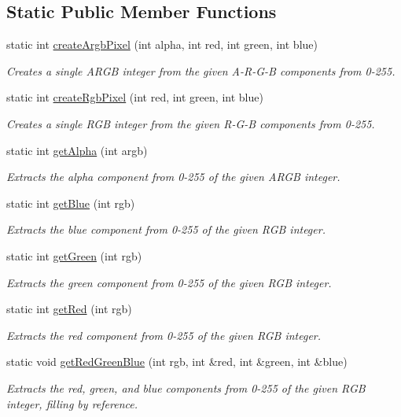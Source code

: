 \subsection*{Static Public Member Functions}
\begin{DoxyCompactItemize}
\item 
static int \mbox{\hyperlink{classsgl_1_1GCanvas_a5ef799a28166a7f009365102168a2d06}{create\+Argb\+Pixel}} (int alpha, int red, int green, int blue)
\begin{DoxyCompactList}\small\item\em Creates a single A\+R\+GB integer from the given A-\/\+R-\/\+G-\/B components from 0-\/255. \end{DoxyCompactList}\item 
static int \mbox{\hyperlink{classsgl_1_1GCanvas_a10beefcf8631433d0cdddefd4e24c76a}{create\+Rgb\+Pixel}} (int red, int green, int blue)
\begin{DoxyCompactList}\small\item\em Creates a single R\+GB integer from the given R-\/\+G-\/B components from 0-\/255. \end{DoxyCompactList}\item 
static int \mbox{\hyperlink{classsgl_1_1GCanvas_a48d898ddf58651669b5f33240a65096f}{get\+Alpha}} (int argb)
\begin{DoxyCompactList}\small\item\em Extracts the alpha component from 0-\/255 of the given A\+R\+GB integer. \end{DoxyCompactList}\item 
static int \mbox{\hyperlink{classsgl_1_1GCanvas_a9406c01e6961257db37b5dc95945f914}{get\+Blue}} (int rgb)
\begin{DoxyCompactList}\small\item\em Extracts the blue component from 0-\/255 of the given R\+GB integer. \end{DoxyCompactList}\item 
static int \mbox{\hyperlink{classsgl_1_1GCanvas_ac307c120ba81c4531d46924ba3358382}{get\+Green}} (int rgb)
\begin{DoxyCompactList}\small\item\em Extracts the green component from 0-\/255 of the given R\+GB integer. \end{DoxyCompactList}\item 
static int \mbox{\hyperlink{classsgl_1_1GCanvas_adef2eb72dada1f3c3ef5079705cd278a}{get\+Red}} (int rgb)
\begin{DoxyCompactList}\small\item\em Extracts the red component from 0-\/255 of the given R\+GB integer. \end{DoxyCompactList}\item 
static void \mbox{\hyperlink{classsgl_1_1GCanvas_ab13dd3d16d2b7bd90fbf9595df9cf2b7}{get\+Red\+Green\+Blue}} (int rgb, int \&red, int \&green, int \&blue)
\begin{DoxyCompactList}\small\item\em Extracts the red, green, and blue components from 0-\/255 of the given R\+GB integer, filling by reference. \end{DoxyCompactList}\end{DoxyCompactItemize}
